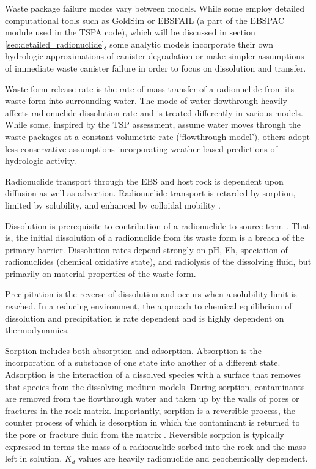 Waste package failure modes vary between models. While some employ detailed 
computational tools such as GoldSim or EBSFAIL (a part of the EBSPAC module 
used in the TSPA code), which will be discussed in section 
\ref{sec:detailed_radionuclide}, some 
analytic models incorporate their own hydrologic approximations of
canister degradation or make simpler assumptions of immediate waste canister 
failure in order to focus on dissolution and transfer. 

Waste form release rate is the rate of mass transfer of a radionuclide from its
waste form into surrounding water. The mode of water flowthrough heavily
affects radionuclide dissolution rate and is treated differently in various models.
While some, inspired by the TSP assessment, assume water moves through the
waste packages at a constant volumetric rate (`flowthrough model'), others
adopt less conservative assumptions incorporating weather based predictions of
hydrologic activity.

Radionuclide transport through the \gls{EBS} and host rock is dependent upon 
diffusion as well as advection. Radionuclide transport is retarded by sorption,
limited by solubility, and enhanced by colloidal mobility 
\cite{bracke_safety_2008}. 

Dissolution is prerequisite to contribution of a radionuclide to source term 
\cite{bracke_safety_2008}. That is, the initial 
dissolution of a radionuclide from its waste form is a breach of the primary
barrier. Dissolution rates depend strongly on pH, Eh,
speciation of radionuclides (chemical oxidative state), and radiolysis of the
dissolving fluid, but primarily on material properties of the waste form.

Precipitation is the reverse of dissolution and occurs when a solubility limit
is reached. In a reducing environment, the approach to chemical equilibrium of 
dissolution and precipitation is rate dependent and is highly dependent on 
thermodynamics.

Sorption includes both absorption and adsorption. Absorption is the 
incorporation of a substance of one state into another of a different state.
Adsorption is the interaction of a dissolved species with a surface that
removes that species from the dissolving medium models. During sorption, 
contaminants are removed from the flowthrough water and taken up by the 
walls of pores or fractures in the rock matrix.  Importantly, sorption is a 
reversible process, the  counter process of which is desorption in which the 
contaminant is returned to the pore or fracture fluid from the matrix
\cite{ahn_mass_1988} . Reversible sorption is typically expressed in terms 
the mass of a radionuclide sorbed into the rock and the mass left in solution. 
$K_d$ values are heavily radionuclide and geochemically dependent.  

